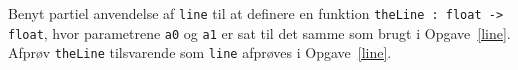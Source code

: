 \label{theLine} Benyt partiel anvendelse af \lstinline{line} til at definere en funktion \lstinline{theLine : float -> float}, hvor parametrene \lstinline{a0} og \lstinline{a1} er sat til det samme som brugt i Opgave~\ref{line}. Afprøv \lstinline{theLine} tilsvarende som \lstinline{line} afprøves i Opgave~\ref{line}.
